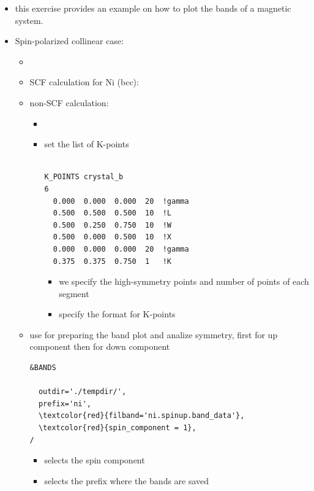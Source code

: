 \documentclass[landscape]{foils}
\begin{document}
\begin{itemize}
  \item this exercise provides an example on how to plot the bands of a magnetic system. 
  \item Spin-polarized collinear case:
    \begin{itemize}
      \item {}
      \item SCF calculation for Ni (bcc): 
      \item non-SCF calculation: 
      \begin{itemize}
        \item {}
        \item set the list of K-points \\
        \\
        \begin{minipage}{12cm}
          \begin{Verbatim}[frame=single, commandchars=\\\{\},fontsize=\small]
K_POINTS crystal_b
6
  0.000  0.000  0.000  20  !gamma
  0.500  0.500  0.500  10  !L
  0.500  0.250  0.750  10  !W
  0.500  0.000  0.500  10  !X
  0.000  0.000  0.000  20  !gamma
  0.375  0.375  0.750  1   !K
          \end{Verbatim}
        \end{minipage}
  \parbox{12cm}{
    \small
    \begin{itemize}
      \item we specify the high-symmetry points and number of points of each segment
      \item {} specify the format for K-points
    \end{itemize}
  }
  \end{itemize}
\item use  for preparing the band plot and analize symmetry, first for up component 
  then for down component \\


\begin{minipage}{12cm}
   \begin{Verbatim}[frame=single, commandchars=\\\{\},fontsize=\small]
&BANDS
       
  outdir='./tempdir/',
  prefix='ni',
  \textcolor{red}{filband='ni.spinup.band_data'}, 
  \textcolor{red}{spin_component = 1},
/
   \end{Verbatim}
  \end{minipage}
  \hfill
  \parbox{10cm}{
    \small
    \begin{itemize}
      \item {} selects the spin component 
      \item {} selects the prefix where the bands are saved
    \end{itemize}
  }\hfill
  \vskip 1cm


\end{itemize}
\end{itemize}
\end{document}
